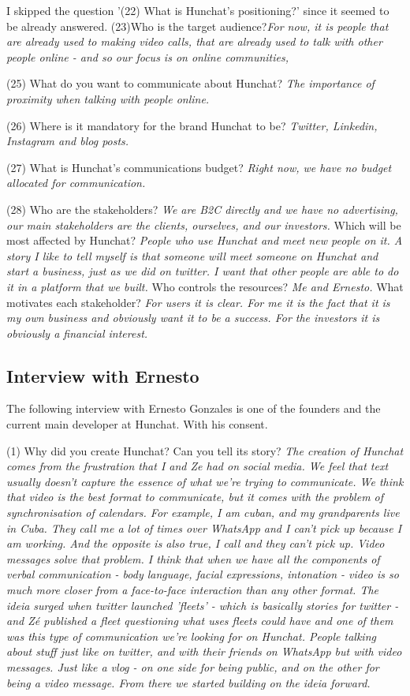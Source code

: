 \documentclass[12pt]{article}
\begin{document}
I skipped the question '(22) What is Hunchat’s positioning?' since it seemed to be already answered. (23)Who is the target audience?\textit{For now, it is people that are already used to making video calls, that are already used to talk with other people online - and so our focus is on online communities,}

(25) What do you want to communicate about Hunchat? \textit{The importance of proximity when talking with people online.}

(26) Where is it mandatory for the brand Hunchat to be? \textit{Twitter, Linkedin, Instagram and blog posts.}

(27) What is Hunchat’s communications budget? \textit{Right now, we have no budget allocated for communication.}

(28) Who are the stakeholders? \textit{We are B2C directly and we have no advertising, our main stakeholders are the clients, ourselves, and our investors.}  Which will be most affected by Hunchat? \textit{People who use Hunchat and meet new people on it. A story I like to tell myself is that someone will meet someone on Hunchat and start a business, just as we did on twitter. I want that other people are able to do it in a platform that we built. } Who controls the resources? \textit{Me and Ernesto.} What motivates each stakeholder? \textit{For users it is clear. For me it is the fact that it is my own business and obviously want it to be a success. For the investors it is obviously a financial interest.}

\subsection{Interview with Ernesto} \label{ernesto}
The following interview with Ernesto Gonzales is one of the founders and the current main developer at Hunchat. With his consent.

(1) Why did you create Hunchat? Can you tell its story? \textit{The creation of Hunchat comes from the frustration that I and Ze had on social media. We feel that text usually doesn't capture the essence of what we're trying to communicate. We think that video is the best format to communicate, but it comes with the problem of synchronisation of calendars. For example, I am cuban, and my grandparents live in Cuba. They call me a lot of times over WhatsApp and I can't pick up because I am working. And the opposite is also true, I call and they can't pick up. Video messages solve that problem. I think that when we have all the components of verbal communication - body language, facial expressions, intonation - video is so much more closer from a face-to-face interaction than any other format. The ideia surged when twitter launched 'fleets' - which is basically stories for twitter - and Zé published a fleet questioning what uses fleets could have and one of them was this type of communication we're looking for on Hunchat. People talking about stuff just like on twitter, and with their friends on WhatsApp but with video messages. Just like a vlog - on one side for being public, and on the other for being a video message. From there we started building on the ideia forward.}
\end{document}
